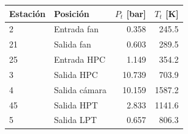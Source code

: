 \begin{tabular}{llrr}
\toprule
Estación & Posición & $P_t$ [bar] & $T_t$ [K] \\
\midrule
  2 & Entrada fan & 0.358 & 245.5 \\
  21 & Salida fan & 0.603 & 289.5 \\
  25 & Entrada HPC & 1.149 & 354.2 \\
  3 & Salida HPC & 10.739 & 703.9 \\
  4 & Salida cámara & 10.159 & 1587.2 \\
  45 & Salida HPT & 2.833 & 1141.6 \\
  5 & Salida LPT & 0.657 & 806.3 \\
\bottomrule
\end{tabular}
